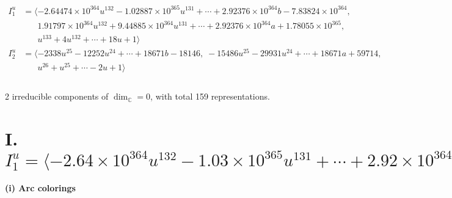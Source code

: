 \documentclass[1p]{elsarticle_modified}
\theoremstyle{definition}
\begin{document}
\begin{align*}
I^u_{1}&=\langle 
-2.64474\times10^{364} u^{132}-1.02887\times10^{365} u^{131}+\cdots+2.92376\times10^{364} b-7.83824\times10^{364},\\
\phantom{I^u_{1}}&\phantom{= \langle  }1.91797\times10^{364} u^{132}+9.44885\times10^{364} u^{131}+\cdots+2.92376\times10^{364} a+1.78055\times10^{365},\\
\phantom{I^u_{1}}&\phantom{= \langle  }u^{133}+4 u^{132}+\cdots+18 u+1\rangle \\
I^u_{2}&=\langle 
-2338 u^{25}-12252 u^{24}+\cdots+18671 b-18146,\;-15486 u^{25}-29931 u^{24}+\cdots+18671 a+59714,\\
\phantom{I^u_{2}}&\phantom{= \langle  }u^{26}+u^{25}+\cdots-2 u+1\rangle \\
\\
\end{align*}
\raggedright * 2 irreducible components of $\dim_{\mathbb{C}}=0$, with total 159 representations.\\
\newpage
\renewcommand{\arraystretch}{1}
\centering \section*{I. $I^u_{1}= \langle -2.64\times10^{364} u^{132}-1.03\times10^{365} u^{131}+\cdots+2.92\times10^{364} b-7.84\times10^{364},\;1.92\times10^{364} u^{132}+9.45\times10^{364} u^{131}+\cdots+2.92\times10^{364} a+1.78\times10^{365},\;u^{133}+4 u^{132}+\cdots+18 u+1 \rangle$}
\flushleft \textbf{(i) Arc colorings}\\
\end{document}
